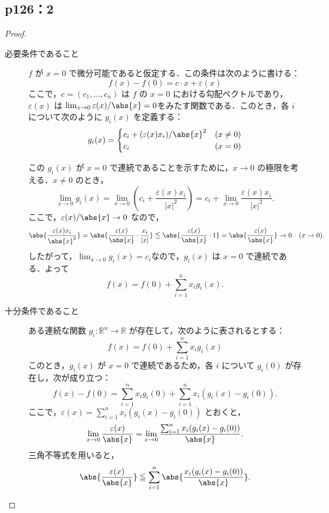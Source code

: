 \documentclass[a4paper,10pt,fleqn]{ltjsarticle}
\begin{document}
\subsection*{p126：2}


\begin{tleftbar}
    \begin{proof}
        \begin{description}
            \item[必要条件であること] 
            $ f $ が $ x=0 $ で微分可能であると仮定する．この条件は次のように書ける：
            \[
            f(x) - f(0) = c \cdot x + \varepsilon(x)
            \]
            ここで，$ c = (c_1, \ldots, c_n) $ は $ f $ の $ x=0 $ における勾配ベクトルであり，$ \varepsilon(x) $ は
            $\lim_{x \to 0} \varepsilon(x)/\abs{x} = 0$をみたす関数である．このとき，各 $ i $ について次のように $ g_i(x) $ を定義する：
            \[
            g_i(x) = 
            \begin{cases}
            c_i + (\varepsilon(x) x_i)/\abs{x}^2 & (x \ne 0) \\
            c_i & (x = 0)
            \end{cases}
            \]

            この $ g_i(x) $ が $ x=0 $ で連続であることを示すために，$ x \to 0 $ の極限を考える．$ x \ne 0 $ のとき，
            \[
            \lim_{x \to 0} g_i(x) = \lim_{x \to 0} \left( c_i + \frac{\varepsilon(x) x_i}{|x|^2} \right) = c_i + \lim_{x \to 0} \frac{\varepsilon(x) x_i}{|x|^2}.
            \]
            ここで，$\varepsilon(x)/\abs{x} \to 0 $ なので，
            \[
            \abs{\frac{\varepsilon(x) x_i}{\abs{x}^2}} = \abs{\frac{\varepsilon(x)}{\abs{x}} \cdot \frac{x_i}{|x|}} \leqq  \abs{\frac{\varepsilon(x)}{\abs{x}} \cdot 1} = \abs{\frac{\varepsilon(x)}{\abs{x}}} \to 0 \quad (x \to 0).
            \]
            したがって，$\lim_{x \to 0} g_i(x) = c_i$なので，$ g_i(x) $ は $ x=0 $ で連続である．よって
            \[
            f(x) = f(0) + \sum_{i=1}^n x_i g_i(x).
            \]
            \item [十分条件であること]
            ある連続な関数 $ g_i \colon \mathbb{R}^n \to \mathbb{R} $ が存在して，次のように表されるとする：
            \[
            f(x) = f(0) + \sum_{i=1}^n x_i g_i(x)
            \]
            このとき，$ g_i(x) $ が $ x=0 $ で連続であるため，各 $ i $ について $ g_i(0) $ が存在し，次が成り立つ：
            \[
            f(x) - f(0) = \sum_{i=1}^n x_i g_i(0) + \sum_{i=1}^n x_i (g_i(x) - g_i(0)).
            \]
            ここで，$ \varepsilon(x) = \sum_{i=1}^n x_i (g_i(x) - g_i(0)) $ とおくと，
            \[
            \lim_{x \to 0} \frac{\varepsilon(x)}{\abs{x}} = \lim_{x \to 0} \frac{\sum_{i=1}^n x_i (g_i(x) - g_i(0))}{\abs{x}}.
            \]
            三角不等式を用いると，
            \[
            \abs{ \frac{\varepsilon(x)}{\abs{x}} } \leqq \sum_{i=1}^n \abs{ \frac{x_i(g_i(x) - g_i(0))}{\abs{x}} }.
            \]


\end{description}
\end{proof}
\end{tleftbar}
\end{document}
